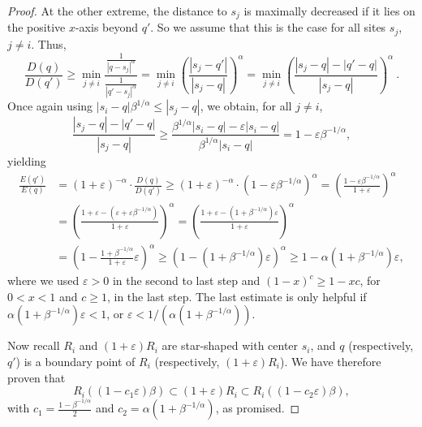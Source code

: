 \documentclass[11pt]{article}
\theoremstyle{remark}
\let\eps\varepsilon
\begin{document}
\begin{proof}
  At the other extreme, the distance to $s_j$ is maximally decreased if it lies on the positive $x$-axis beyond $q'$.  So we assume that this is the case for all sites $s_j$, $j\neq i$. Thus,
\[
     \frac{D(q)}{D(q')} \ge
     \min_{j \ne i}\frac{\frac{1}{|q-s_j|^\alpha}}{\frac{1}{|q'-s_j|^\alpha}} = \min_{j \ne i}(\frac{|s_j-q'|}{|s_j-q|})^\alpha =
     \min_{j \ne i}(\frac{|s_j-q|-|q'-q|}{|s_j-q|})^\alpha \ .
  \]  
Once again using $|s_i-q| \beta^{1/\alpha} \leq |s_j-q|$, we obtain, for all $j\neq i$,
  \[
    \frac{|s_j-q|-|q'-q|}{|s_j-q|} \geq \frac{\beta^{1/\alpha} |s_i-q|-\eps|s_i-q|}{\beta^{1/\alpha}|s_i-q|} =
    {1-\eps\beta^{-1/\alpha}},
  \]
  yielding
  \begin{align*}
    \frac{E(q')}{E(q)} & = (1+\eps)^{-\alpha} \cdot \frac{D(q)}{D(q')} \ge
    (1+\eps)^{-\alpha} \cdot (1-\eps\beta^{-1/\alpha})^\alpha  
    = (\frac{1-\eps\beta^{-1/\alpha}}{1+\eps})^\alpha \\ 
    & = (\frac{1+\eps-(\eps+\eps\beta^{-1/\alpha})}{1+\eps})^{\alpha}
    = (\frac{1+\eps-(1+\beta^{-1/\alpha})\eps}{1+\eps})^{\alpha} \\
    & = (1 - \frac{1+\beta^{-1/\alpha}}{1+\eps}\eps)^{\alpha} 
    \geq (1 - (1+\beta^{-1/\alpha})\eps)^{\alpha}
    \geq 1-\alpha(1+\beta^{-1/\alpha})\eps,
  \end{align*}
  where we used $\eps>0$ in the second to last step and $(1-x)^c\geq 1-xc$, for $0<x<1$ and $c\geq1$, in the last step.  The last estimate is only helpful if $\alpha(1+\beta^{-1/\alpha})\eps<1$, or $\eps <1/(\alpha(1+\beta^{-1/\alpha}))$.

  Now recall $R_i$ and $(1+\eps)R_i$ are star-shaped with center $s_i$, and $q$ (respectively, $q'$) is a boundary point of $R_i$ (respectively, $(1+\eps)R_i$).  We have therefore proven that 
  \[
    R_i((1-c_1\eps)\beta) \subset (1+\eps)R_i \subset R_i((1-c_2\eps)\beta),
  \]
  with $c_1=\frac{1-\beta^{-1/\alpha}}{2}$ and $c_2=\alpha(1+\beta^{-1/\alpha})$, as promised.
\end{proof}
\end{document}
